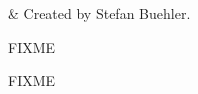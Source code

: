 %
%
\label{sec:interpolation}


%
%
 & Created by Stefan Buehler.\\
\stophistory




%
%

FIXME

\label{sec:matpack:files}

FIXME




